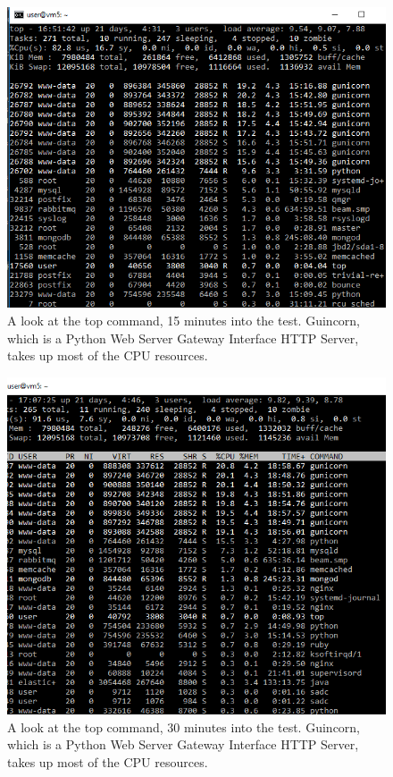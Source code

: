 \documentclass[12pt]{report}
\begin{document}
\newpage
\begin{figure}[h!]
	\centering
	\includegraphics[width=\textwidth,height=\textheight,keepaspectratio]{intro/S1.png}
	\caption{A look at the top command, 15 minutes into the test. Guincorn, which is a Python Web Server Gateway Interface HTTP Server, takes up most of the CPU resources.}
\end{figure}
\begin{figure}[h!]
	\centering
	\includegraphics[width=\textwidth,height=\textheight,keepaspectratio]{intro/S2.png}
	\caption{A look at the top command, 30 minutes into the test. Guincorn, which is a Python Web Server Gateway Interface HTTP Server, takes up most of the CPU resources. }
\end{figure}
\end{document}
